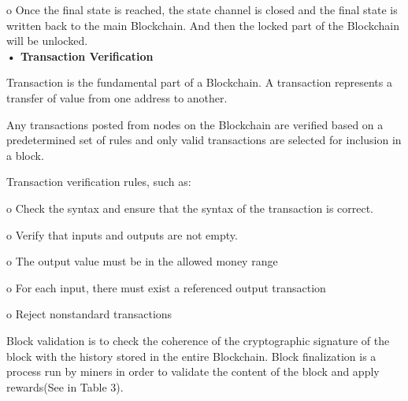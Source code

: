 \documentclass[fleqn,10pt]{SelfArx} %
\begin{document}
o	Once the final state is reached, the state channel is closed and the final state is written back to the main Blockchain. And then the locked part of the Blockchain will be unlocked.\\

\textbf {•	Transaction Verification}

Transaction is the fundamental part of a Blockchain. A transaction represents a transfer of value from
one address to another.

Any transactions posted from nodes on the Blockchain are verified based on a predetermined set of rules and only valid transactions are selected for inclusion in a block.

Transaction verification rules, such as:

o	Check the syntax and ensure that the syntax of the transaction is correct.

o	Verify that inputs and outputs are not empty.

o	The output value must be in the allowed money range

o	For each input, there must exist a referenced output transaction

o	Reject nonstandard transactions

Block validation is to check the coherence of the cryptographic signature of the block with the history stored in the entire Blockchain. Block finalization is a process run by miners in order to validate the content of the block and apply rewards(See in Table 3).\\
\end{document}
